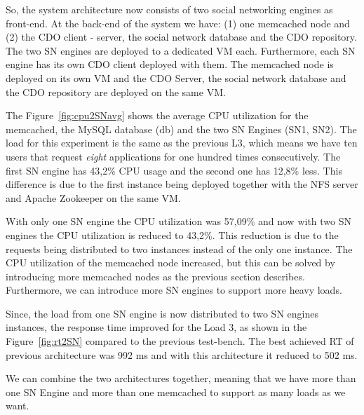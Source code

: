 So, the system architecture now consists of two social networking engines as front-end. At the back-end of the system we have: (1) one memcached node and (2) the CDO client - server, the social network database and the CDO repository. The two SN engines are deployed to a dedicated VM each. Furthermore, each SN engine has its own CDO client deployed with them. The memcached node is deployed on its own VM and the CDO Server, the social network database and the CDO repository are deployed on the same VM.

The Figure~\ref{fig:cpu2SNavg} shows the average CPU utilization for the memcached, the MySQL database (db) and the two SN Engines (SN1, SN2). The load for this experiment is the same as the previous L3, which means we have ten users that request \emph{eight} applications for one hundred times consecutively. The first SN engine has 43,2\% CPU usage and the second one has 12,8\% less. This difference is due to the first instance being deployed together with the NFS server and Apache Zookeeper on the same VM. 

With only one SN engine the CPU utilization was 57,09\% and now with two SN engines the CPU utilization is reduced to 43,2\%. This reduction is due to the requests being distributed to two instances instead of the only one instance. The CPU utilization of the memcached node increased, but this can be solved by introducing more memcached nodes as the previous section describes. Furthermore, we can introduce more SN engines to support more heavy loads.

Since, the load from one SN engine is now distributed to two SN engines instances, the response time improved for the Load 3, as shown in the Figure~\ref{fig:rt2SN} compared to the previous test-bench. The best achieved RT of previous architecture was 992 ms and with this architecture it reduced to 502 ms.

We can combine the two architectures together, meaning that we have more than one SN Engine and more than one memcached to support as many loads as we want.

